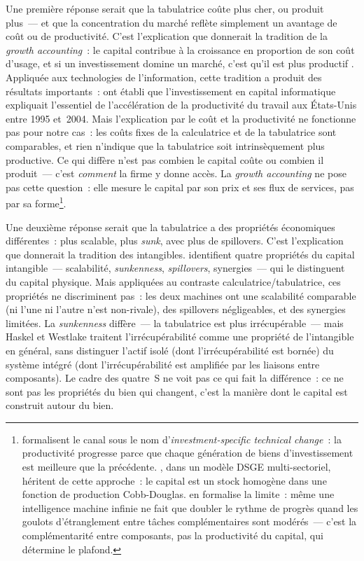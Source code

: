 \markNEO
Une première réponse serait que la tabulatrice coûte plus cher, ou produit plus~--- et que la concentration du marché reflète simplement un avantage de coût ou de productivité. C'est l'explication que donnerait la tradition de la \emph{growth accounting}~: le capital contribue à la croissance en proportion de son coût d'usage, et si un investissement domine un marché, c'est qu'il est plus productif \parencite{solow_contribution_1956,jorgenson_retrospective_2008}. Appliquée aux technologies de l'information, cette tradition a produit des résultats importants~: \textcite{oliner_resurgence_2000,oliner_explaining_2007} ont établi que l'investissement en capital informatique expliquait l'essentiel de l'accélération de la productivité du travail aux États-Unis entre 1995 et~2004. Mais l'explication par le coût et la productivité ne fonctionne pas pour notre cas~: les coûts fixes de la calculatrice et de la tabulatrice sont comparables, et rien n'indique que la tabulatrice soit intrinsèquement plus productive. Ce qui diffère n'est pas combien le capital coûte ou combien il produit~--- c'est \emph{comment} la firme y donne accès. La \emph{growth accounting} ne pose pas cette question~: elle mesure le capital par son prix et ses flux de services, pas par sa forme\footnote{\textcite{greenwood_long_1997} formalisent le canal sous le nom d'\emph{investment-specific technical change}~: la productivité progresse parce que chaque génération de biens d'investissement est meilleure que la précédente. \textcite{falck_digital_2024}, dans un modèle DSGE multi-sectoriel, héritent de cette approche~: le capital est un stock homogène dans une fonction de production Cobb-Douglas. \textcite{jones_ai_rd_2025} en formalise la limite~: même une intelligence machine infinie ne fait que doubler le rythme de progrès quand les goulots d'étranglement entre tâches complémentaires sont modérés~--- c'est la complémentarité entre composants, pas la productivité du capital, qui détermine le plafond.}.

Une deuxième réponse serait que la tabulatrice a des propriétés économiques différentes~: plus scalable, plus \emph{sunk}, avec plus de spillovers. C'est l'explication que donnerait la tradition des intangibles. \textcite{haskel_capitalism_2018} identifient quatre propriétés du capital intangible~--- scalabilité, \emph{sunkenness}, \emph{spillovers}, synergies~--- qui le distinguent du capital physique. Mais appliquées au contraste calculatrice/tabulatrice, ces propriétés ne discriminent pas~: les deux machines ont une scalabilité comparable (ni l'une ni l'autre n'est non-rivale), des spillovers négligeables, et des synergies limitées. La \emph{sunkenness} diffère~--- la tabulatrice est plus irrécupérable~--- mais Haskel et Westlake traitent l'irrécupérabilité comme une propriété de l'intangible en général, sans distinguer l'actif isolé (dont l'irrécupérabilité est bornée) du système intégré (dont l'irrécupérabilité est amplifiée par les liaisons entre composants). Le cadre des quatre~S ne voit pas ce qui fait la différence~: ce ne sont pas les propriétés du bien qui changent, c'est la manière dont le capital est construit autour du bien.

